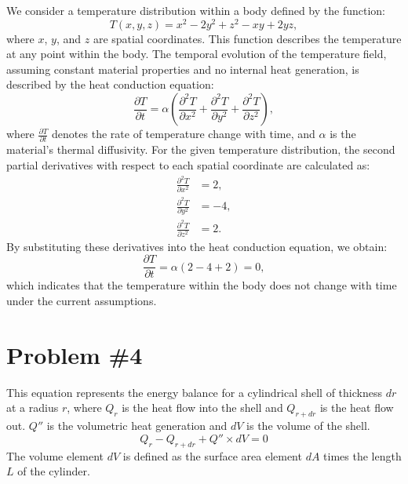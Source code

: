 \documentclass{article}
\numberwithin{equation}{section}
\begin{document}
We consider a temperature distribution within a body defined by the function:
\begin{equation}
T(x, y, z) = x^2 - 2y^2 + z^2 - xy + 2yz,
\end{equation}
where \(x\), \(y\), and \(z\) are spatial coordinates. This function describes the temperature at any point within the body.
\newline\newline
The temporal evolution of the temperature field, assuming constant material properties and no internal heat generation, is described by the heat conduction equation:
\begin{equation}
\frac{\partial T}{\partial t} = \alpha \left( \frac{\partial^2 T}{\partial x^2} + \frac{\partial^2 T}{\partial y^2} + \frac{\partial^2 T}{\partial z^2} \right),
\end{equation}
where \(\frac{\partial T}{\partial t}\) denotes the rate of temperature change with time, and \(\alpha\) is the material's thermal diffusivity.
\newline\newline
For the given temperature distribution, the second partial derivatives with respect to each spatial coordinate are calculated as:
\begin{align}
\frac{\partial^2 T}{\partial x^2} &= 2, \\
\frac{\partial^2 T}{\partial y^2} &= -4, \\
\frac{\partial^2 T}{\partial z^2} &= 2.
\end{align}
\noindent
By substituting these derivatives into the heat conduction equation, we obtain:
\begin{equation}
\frac{\partial T}{\partial t} = \alpha (2 - 4 + 2) = 0,
\end{equation}
which indicates that the temperature within the body does not change with time under the current assumptions.



\newpage
\section{Problem \#4}
\noindent
This equation represents the energy balance for a cylindrical shell of thickness \( dr \) at a radius \( r \), where \( Q_r \) is the heat flow into the shell and \( Q_{r+dr} \) is the heat flow out. \( Q'' \) is the volumetric heat generation and \( dV \) is the volume of the shell.
\begin{equation}
Q_r - Q_{r+dr} + Q'' \times dV = 0
\end{equation}
\noindent
The volume element \( dV \) is defined as the surface area element \( dA \) times the length \( L \) of the cylinder.
\end{document}
